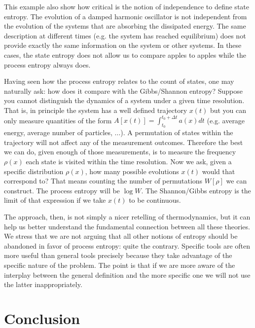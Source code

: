 \documentclass[letterpaper,twocolumn]{article}
\begin{document}
This example also show how critical is the notion of independence to define state entropy. The evolution of a damped harmonic oscillator is not independent from the evolution of the systems that are absorbing the dissipated energy. The same description at different times (e.g. the system has reached equilibrium) does not provide exactly the same information on the system or other systems. In these cases, the state entropy does not allow us to compare apples to apples while the process entropy always does.

Having seen how the process entropy relates to the count of states, one may naturally ask: how does it compare with the Gibbs/Shannon entropy? Suppose you cannot distinguish the dynamics of a system under a given time resolution. That is, in principle the system has a well defined trajectory $x(t)$ but you can only measure quantities of the form $A[x(t)] = \int_{t_0}^{t_0 + \Delta t} a(x) dt$ (e.g. average energy, average number of particles, ...). A permutation of states within the trajectory will not affect any of the measurement outcomes. Therefore the best we can do, given enough of those measurements, is to measure the frequency $\rho(x)$ each state is visited within the time resolution. Now we ask, given a specific distribution $\rho(x)$, how many possible evolutions $x(t)$ would that correspond to? That means counting the number of permutations $W[\rho]$ we can construct. The process entropy will be $\log W$. The Shannon/Gibbs entropy is the limit of that expression if we take $x(t)$ to be continuous.

The approach, then, is not simply a nicer retelling of thermodynamics, but it can help us better understand the fundamental connection between all these theories. We stress that we are not arguing that all other notions of entropy should be abandoned in favor of process entropy: quite the contrary. Specific tools are often more useful than general tools precisely because they take advantage of the specific nature of the problem. The point is that if we are more aware of the interplay between the general definition and the more specific one we will not use the latter inappropriately.

\section{Conclusion}


\end{document}
